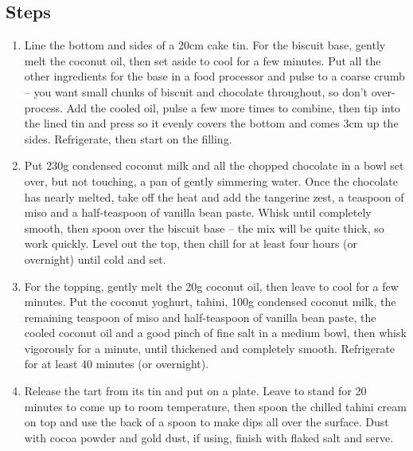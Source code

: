 \documentclass{book}
\begin{document}
\subsection*{Steps}
\begin{enumerate}
\item Line the bottom and sides of a 20cm cake tin. For the biscuit base, gently melt the coconut oil, then set aside to cool for a few minutes. Put all the other ingredients for the base in a food processor and pulse to a coarse crumb – you want small chunks of biscuit and chocolate throughout, so don’t over-process. Add the cooled oil, pulse a few more times to combine, then tip into the lined tin and press so it evenly covers the bottom and comes 3cm up the sides. Refrigerate, then start on the filling.
\item Put 230g condensed coconut milk and all the chopped chocolate in a bowl set over, but not touching, a pan of gently simmering water. Once the chocolate has nearly melted, take off the heat and add the tangerine zest, a teaspoon of miso and a half-teaspoon of vanilla bean paste. Whisk until completely smooth, then spoon over the biscuit base – the mix will be quite thick, so work quickly. Level out the top, then chill for at least four hours (or overnight) until cold and set.
\item For the topping, gently melt the 20g coconut oil, then leave to cool for a few minutes. Put the coconut yoghurt, tahini, 100g condensed coconut milk, the remaining teaspoon of miso and half-teaspoon of vanilla bean paste, the cooled coconut oil and a good pinch of fine salt in a medium bowl, then whisk vigorously for a minute, until thickened and completely smooth. Refrigerate for at least 40 minutes (or overnight).
\item Release the tart from its tin and put on a plate. Leave to stand for 20 minutes to come up to room temperature, then spoon the chilled tahini cream on top and use the back of a spoon to make dips all over the surface. Dust with cocoa powder and gold dust, if using, finish with flaked salt and serve.
\end{enumerate}
\newpage
\end{document}
